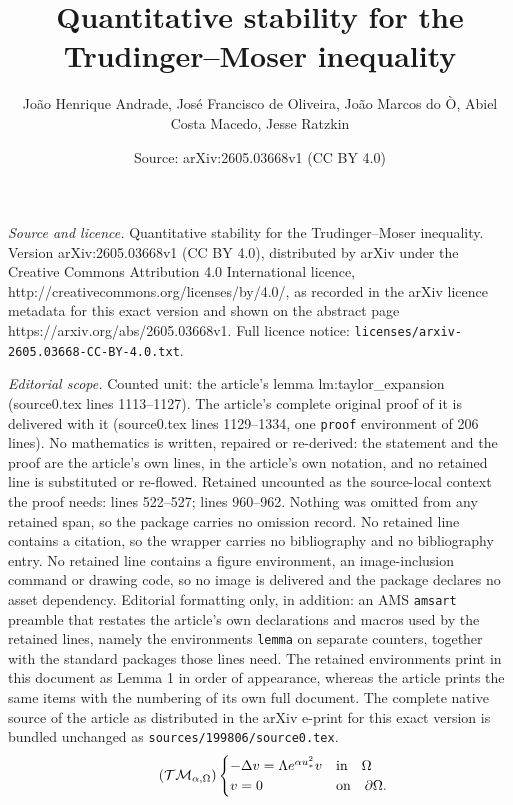 \documentclass[10pt,a4paper]{amsart}
\title{Quantitative stability for the Trudinger--Moser inequality}
\author{Jo\~ao Henrique Andrade, Jos\'e Francisco de Oliveira, Jo\~ao Marcos do \`O, Abiel Costa Macedo, Jesse Ratzkin}
\date{Source: arXiv:2605.03668v1 (CC BY 4.0)}
\begin{document}
\maketitle

\noindent\emph{Source and licence.} Quantitative stability for the Trudinger--Moser inequality. Version arXiv:2605.03668v1 (CC BY 4.0), distributed by arXiv under the Creative Commons Attribution 4.0 International licence, http://creativecommons.org/licenses/by/4.0/, as recorded in the arXiv licence metadata for this exact version and shown on the abstract page https://arxiv.org/abs/2605.03668v1. Full licence notice: \texttt{licenses/arxiv-2605.03668-CC-BY-4.0.txt}.\par\smallskip

\noindent\textit{Editorial scope.} Counted unit: the article's lemma lm:taylor\_expansion (source0.tex lines 1113--1127). The article's complete original proof of it is delivered with it (source0.tex lines 1129--1334, one \texttt{proof} environment of 206 lines). No mathematics is written, repaired or re-derived: the statement and the proof are the article's own lines, in the article's own notation, and no retained line is substituted or re-flowed.  Retained uncounted as the source-local context the proof needs: lines 522--527; lines 960--962.  Nothing was omitted from any retained span, so the package carries no omission record.  No retained line contains a citation, so the wrapper carries no bibliography and no bibliography entry.  No retained line contains a figure environment, an image-inclusion command or drawing code, so no image is delivered and the package declares no asset dependency.  Editorial formatting only, in addition: an AMS \texttt{amsart} preamble that restates the article's own declarations and macros used by the retained lines, namely the environments \texttt{lemma} on separate counters, together with the standard packages those lines need.  The retained environments print in this document as Lemma 1 in order of appearance, whereas the article prints the same items with the numbering of its own full document.  The complete native source of the article as distributed in the arXiv e-print for this exact version is bundled unchanged as \texttt{sources/199806/source0.tex}.
\begin{equation}\label{eq:TM_BVP}\tag{$\mathcal{TM}_{\alpha,\Omega}$}
		 \begin{cases}
			-\Delta v = \Lambda  e^{\alpha u_{*}^2} v & \mbox{in} \quad \Omega\\
			v=0 & \mbox{on} \quad\partial \Omega.
		\end{cases} 
	\end{equation}
\end{document}
